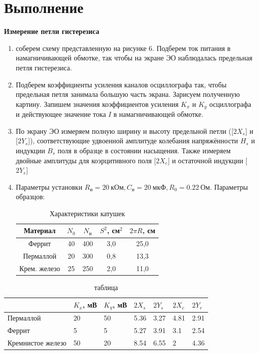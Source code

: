 \documentclass[12pt,a4paper]{article}
\begin{document}
\section{Выполнение}
\textbf{Измерение петли гистерезиса}
\begin{enumerate}
    \item соберем схему представленную на рисунке 6. Подберем ток питания в намагничивающей обмотке, так чтобы на
    экране ЭО наблюдалась предельная петля гистерезиса.
    \item Подберем коэффициенты усиления каналов осциллографа так, чтобы предельная петля занимала большую часть экрана. Зарисуем полученную картину.
    Запишем значения коэффициентов усиления $K_x$ и $K_y$ осциллографа
    и действующее значение тока $I$ в намагничивающей обмотке.
    \item По экрану ЭО измеряем полную ширину и высоту предельной петли ([$2X_s$] и [$2Y_s$]), соответствующие удвоенной амплитуде колебания
    напряжённости $H_s$ и индукции $B_s$ поля в образце в состоянии насыщения. Также измеряем двойные амплитуды для коэрцитивного поля
    [$2X_c$]  и остаточной индукции [$2Y_r$]
    \item Параметры установки $R_\text{и} = 20~\text{кОм}, C_\text{и} = 20~\text{мкФ}, R_0 = 0.22~\text{Ом}$. Параметры образцов:

    \begin{table}[h!]

        \centering
        \begin{tabular}{|c|c|c|c|c|}
          \hline
          Материал     & $N_0$ & $N_\text{и}$ & $S^2$, см$^2$ & $2\pi R$, см \\ \hline
          Феррит       & 40    & 400                              & 3,0           & 25,0         \\ \hline
          Пермаллой    & 20    & 300                              & 0,8           & 13,3         \\ \hline
          Крем. железо & 25    & 250                              & 2,0           & 11,0         \\ \hline
        \end{tabular}
        \caption{Характеристики катушек}
        \label{tab:har_kat}
    \end{table}
      
      


\end{enumerate}
\begin{table}[h!]
    \centering
        \begin{tabular}{|l|l|l|l|l|l|l|}
        \hline 
                          & $K_x$, мВ & $K_y$, мВ & $2X_s$ & $2Y_s$ & $2X_c$ & $2Y_r$   \\ \hline
        Пермаллой         & 20 &         50       &   5.36 &   3.27 &    4.81    & 2.91 \\ \hline
        Феррит            & 5 &          5        &   5.27 &  3.91  &    3.1     & 2.54 \\ \hline
        Кремнистое железо & 50 &         20       &   8.54 &  6.55  &    2       & 4.36 \\ \hline
    \end{tabular}
    \caption{таблица}
\end{table}
\end{document}
